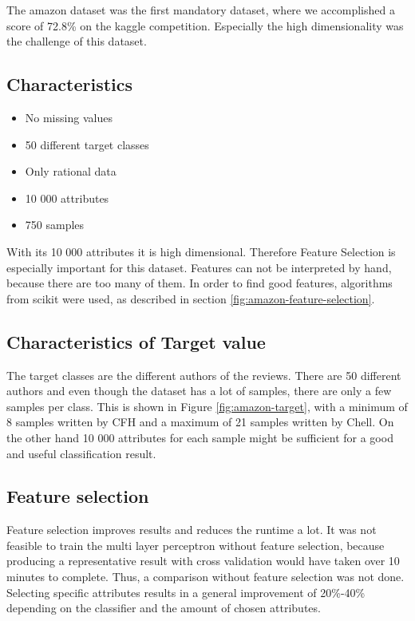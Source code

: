 The amazon dataset was the first mandatory dataset, where we accomplished a score of 72.8\% on the kaggle competition. Especially the high dimensionality was the challenge of this dataset.

\subsection{Characteristics}

\begin{itemize}
\item No missing values
\item 50 different target classes
\item Only rational data
\item 10 000 attributes
\item 750 samples
\end{itemize}

With its 10 000 attributes it is high dimensional.
Therefore Feature Selection is especially important for this dataset. Features can not be interpreted by hand, because there are too many of them.
In order to find good features, algorithms from scikit were used, as described in section \ref{fig:amazon-feature-selection}.

\subsection{Characteristics of Target value}
The target classes are the different authors of the reviews.
There are 50 different authors and even though the dataset has a lot of samples, there are only a few samples per class.
This is shown in Figure \ref{fig:amazon-target}, with a minimum of 8 samples written by CFH and a maximum of 21 samples written by Chell. 
On the other hand 10 000 attributes for each sample might be sufficient for a good and useful classification result.




\subsection{Feature selection}
\label{amazon-feature-selection}
Feature selection improves results and reduces the runtime a lot. It was not feasible to train the multi layer perceptron without feature selection, because producing a representative result with cross validation would have taken over 10 minutes to complete. Thus, a comparison without feature selection was not done. Selecting specific attributes results in a general improvement of 20\%-40\% depending on the classifier and the amount of chosen attributes. 


